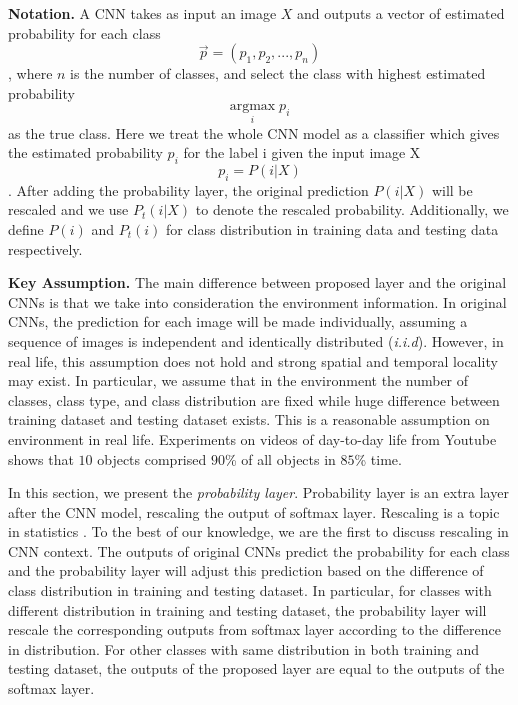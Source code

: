 \documentclass{article}
\begin{document}
\textbf{Notation.} A CNN takes as input an image $X$ and outputs a vector of estimated probability for each class \begin{equation}
    \vec{p} = (p_1, p_2, ..., p_n)
\end{equation}
, where $n$ is the number of classes, and select the class with highest estimated probability 
\begin{equation}
    \underset{i}{\text{argmax}} \; p_i
\end{equation}
as the true class. Here we treat the whole CNN model as a classifier which gives the estimated probability $p_i$ for the label i given the input image X
\begin{equation}
    p_i = P(i|X)
\end{equation}. After adding the probability layer, the original prediction $P(i|X)$ will be rescaled and we use $P_t(i|X)$ to denote the rescaled probability. Additionally, we define $P(i)$ and $P_t(i)$ for class distribution in training data and testing data respectively.


\textbf{Key Assumption. } 
The main difference between proposed layer and the original CNNs is that we take into consideration the environment information. In original CNNs, the prediction for each image will be made individually, assuming a sequence of images is independent and identically distributed (\textit{i.i.d}). However, in real life, this assumption does not hold and strong spatial and temporal locality may exist. In particular, we assume that in the environment the number of classes, class type, and class distribution are fixed while huge difference between training dataset and testing dataset exists. This is a reasonable assumption on environment in real life. Experiments on videos of day-to-day life from Youtube \cite{shen2017fast} shows that $10$ objects comprised $90$\% of all objects in $85$\% time. 


In this section, we present the \textit{probability layer}. Probability layer is an extra layer after the CNN model, rescaling the output of softmax layer. Rescaling is a topic in statistics \cite{saerens2002adjusting}. To the best of our knowledge, we are the first to discuss rescaling in CNN context. The outputs of original CNNs predict the probability for each class and the probability layer will adjust this prediction based on the difference of class distribution in training and testing dataset. In particular, for classes with different distribution in training and testing dataset, the probability layer will rescale the corresponding outputs from softmax layer according to the difference in distribution. For other classes with same distribution in both training and testing dataset, the outputs of the proposed layer are equal to the outputs of the softmax layer. 
\end{document}
